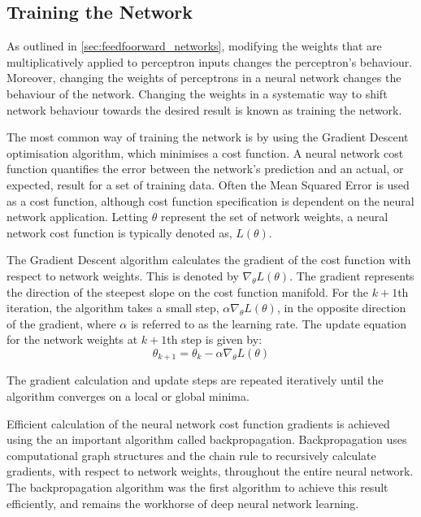 

\subsection{Training the Network} \label{sec:networktraining}
As outlined in \textsection \ref{sec:feedfoorward_networks}, modifying the weights that are multiplicatively applied to perceptron inputs changes the perceptron's behaviour. Moreover, changing the weights of perceptrons in a neural network changes the behaviour of the network. Changing the weights in a systematic way to shift network behaviour towards the desired result is known as training the network.

The most common way of training the network is by using the Gradient Descent optimisation algorithm, which minimises a cost function. A neural network cost function quantifies the error between the network's prediction and an actual, or expected, result for a set of training data. Often the Mean Squared Error is used as a cost function, although cost function specification is dependent on the neural network application. Letting $\theta$ represent the set of network weights, a neural network cost function is typically denoted as, $L(\theta)$.

The Gradient Descent algorithm calculates the gradient of the cost function with respect to network weights. This is denoted by $\nabla_{\theta}L(\theta)$. The gradient represents the direction of the steepest slope on the cost function manifold. For the $k+1$th iteration, the algorithm takes a small step, $\alpha \nabla_{\theta}L(\theta)$, in the opposite direction of the gradient, where $\alpha$ is referred to as the learning rate. The update equation for the network weights at $k+1$th step is given by:
\begin{equation}
	\theta_{k+1} = \theta_{k} - \alpha \nabla_{\theta} L(\theta)
\end{equation} 

The gradient calculation and update steps are repeated iteratively until the algorithm converges on a local or global minima.

Efficient calculation of the neural network cost function gradients is achieved using the an important algorithm called backpropagation. Backpropagation uses computational graph structures and the chain rule to recursively calculate gradients, with respect to network weights, throughout the entire neural network. The backpropagation algorithm was the first algorithm to achieve this result efficiently, and remains the workhorse of deep neural network learning.




